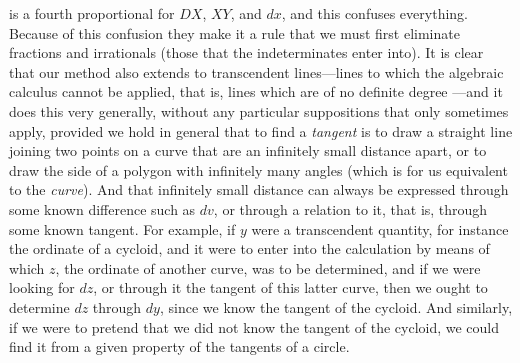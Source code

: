 \documentclass[twoside,openright]{article}
\begin{document}
is a fourth proportional for $DX$, $XY$, and $dx$, and this confuses
everything.  Because of this confusion they make it a rule that we
must first eliminate fractions and irrationals (those that the
indeterminates enter into).  It is clear that our method also extends
to transcendent lines---lines to which the algebraic calculus cannot
be applied, that is, lines which are of no definite
degree \label{trandef}---and it
does this very generally, without any particular suppositions that
only sometimes apply, provided we hold in general that to find a {\em
  tangent} is to draw a straight line joining two points on a curve
that are an infinitely small distance apart\label{taninfcl}, or to
draw the side of a polygon with infinitely many angles (which is for
us equivalent to the {\em curve}).  And that infinitely small distance
can always be expressed through some known difference such as $dv$, or
through a relation to it, that is, through some known tangent.  For
example, if $y$ were a transcendent quantity, for instance the
ordinate of a cycloid, and it were to enter into the calculation by
means of which $z$, the ordinate of another curve, was to be
determined, and if we were looking for $dz$, or through it the tangent
of this latter curve, then we ought to determine $dz$ through $dy$,
since we know the tangent of the cycloid.  And similarly, if we were
to pretend that we did not know the tangent of the cycloid, we could
find it from a given property of the tangents of a
circle.
\end{document}

